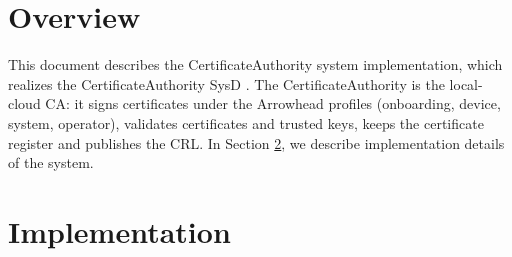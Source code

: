 \documentclass[a4paper]{arrowhead}
\begin{document}
\sloppy

\ArrowheadSetup

\begin{center}
  \vspace*{1cm}
  \huge{\arrowtitle}

  \vspace*{0.2cm}
  \LARGE{\arrowtype}
  \vspace*{1cm}

  \vspace*{\fill}


  \vspace*{1cm}
  \vspace*{\fill}

  \begin{abstract}
    This document describes the design and implementation of the CertificateAuthority support system of Arrowhead 5.2.2 (\texttt{ah5-CertificateAuthority-java-spring}).
  \end{abstract}

  \vspace*{1cm}
\end{center}

\newpage

\tableofcontents
\newpage

\section{Overview}
\label{sec:overview}

This document describes the CertificateAuthority system implementation, which realizes the CertificateAuthority SysD \cite{cau-sysd}. The Certificate\allowbreak{}Authority is the local-cloud CA: it signs certificates under the Arrowhead profiles (onboarding, device, system, operator), validates certificates and trusted keys, keeps the certificate register and publishes the CRL.
In Section \ref{Implementation}, we describe implementation details of the system.

\newpage

\section{Implementation}
\label{Implementation}
\end{document}
